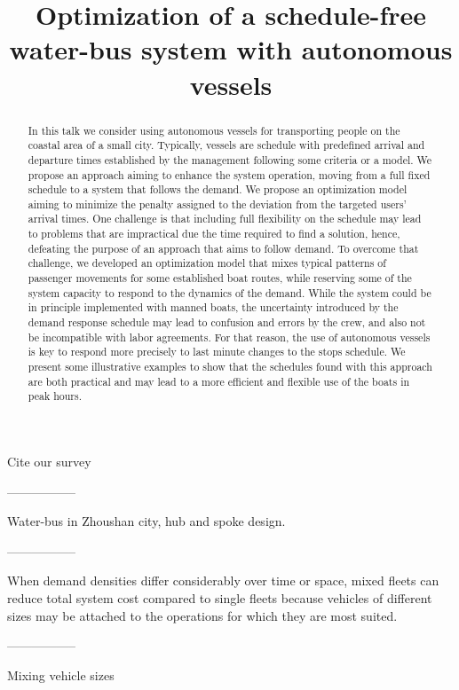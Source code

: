 \documentclass[12pt]{elsarticle}
\begin{document}
\begin{frontmatter}
\title{Optimization of a schedule-free water-bus system with autonomous vessels}

\begin{abstract}
In this talk we consider using autonomous vessels for transporting people
on the coastal area of a small city. Typically, vessels are schedule with
predefined arrival and departure times established by the management
following some criteria or a model. We propose an approach aiming to
enhance the system operation, moving from a full fixed schedule to a system
that follows the demand. We propose an optimization model aiming to
minimize the penalty assigned to the deviation from the targeted users’
arrival times. One challenge is that including full flexibility on the
schedule may lead to problems that are impractical due the time required to
find a solution, hence, defeating the purpose of an approach that aims to
follow demand. To overcome that challenge, we developed an optimization
model that mixes  typical patterns of passenger movements for some
established boat routes, while reserving some of the system capacity to
respond to the dynamics of the demand. While the system could be in
principle implemented with manned boats, the uncertainty introduced by the
demand response schedule may lead to confusion and errors by the crew, and
also not be incompatible with labor agreements. For that reason, the use of
autonomous vessels is key to respond more precisely to last minute changes
to the stops schedule. We present some illustrative examples to show that
the schedules found with this approach are both practical and may lead to a
more efficient and flexible use of the boats in peak hours.
\end{abstract}
\end{frontmatter}

Cite our survey \cite{Gu2021}

-----------------

Water-bus in Zhoushan city, hub and spoke design. \cite{Yu2015}

-----------------

When demand densities differ considerably over time or space, mixed fleets
can reduce total system cost compared to single fleets because vehicles of
different sizes may be attached to the operations for which they are most
suited. \cite{Kim2013}

-----------------

Mixing vehicle sizes \cite{Sun2015}
\end{document}
